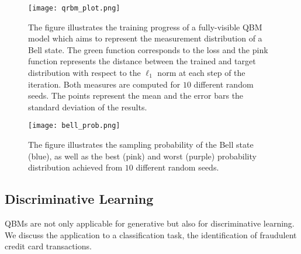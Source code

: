 \documentclass[twocolumn, aps, pra, superscriptaddress, floatfix]{revtex4}
\begin{document}
\begin{figure}[h!]
\captionsetup{singlelinecheck = false, format= hang, justification=raggedright, font=footnotesize, labelsep=space}
\begin{center}
\texttt{[image: qrbm\_plot.png]}
\end{center}
\caption{The figure illustrates the training progress of a fully-visible QBM model which aims to represent the measurement distribution of a Bell state.
The green function corresponds to the loss and the pink function represents the distance between the trained and target distribution with respect to the $\ell_1$ norm at each step of the iteration. 
Both measures are computed for $10$ different random seeds. 
The points represent the mean and the error bars the standard deviation of the results.
}
\label{fig:qrbm}
\end{figure}

\begin{figure}[h!]
\captionsetup{singlelinecheck = false, format= hang, justification=raggedright, font=footnotesize, labelsep=space}
\begin{center}
\texttt{[image: bell\_prob.png]}
\end{center}
\caption{The figure illustrates the sampling probability of the Bell state (blue), as well as the best (pink) and worst (purple) probability distribution achieved from  $10$ different random seeds. 
}
\label{fig:bell_prob}
\end{figure}

\subsection{Discriminative Learning}
\label{subsec:discriminative}

QBMs are not only applicable for generative but also for discriminative learning. We discuss the application to a classification task, the identification of fraudulent credit card transactions.
\end{document}
